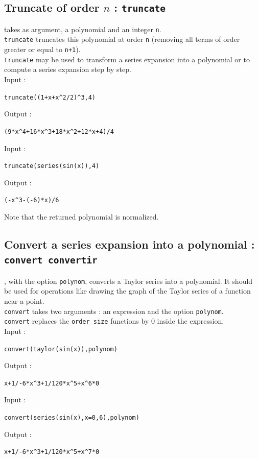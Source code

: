 \documentclass[a4paper,11pt]{book}
\begin{document}
\subsection{Truncate of order $n$ : {\tt truncate}}
 takes as argument, a polynomial and an integer 
{\tt n}.\\
{\tt truncate} truncates this polynomial at order {\tt n} (removing
all terms of order greater or equal to {\tt n+1}).\\
{\tt truncate} may be used to transform a series expansion into a 
polynomial or to compute a series expansion step by step.\\
Input :
\begin{center}{\tt truncate((1+x+x\verb|^|2/2)\verb|^|3,4)}\end{center}
Output :
\begin{center}{\tt (9*x\verb|^|4+16*x\verb|^|3+18*x\verb|^|2+12*x+4)/4}\end{center}
Input :
\begin{center}{\tt truncate(series(sin(x)),4)}\end{center}
Output :
\begin{center}{\tt (-x\verb|^|3-(-6)*x)/6}\end{center}
Note that the returned polynomial is normalized.

\subsection{Convert a series expansion into a polynomial : {\tt convert convertir}}\label{sec:convertpoly}
, with the option {\tt polynom}, converts a Taylor series
into a polynomial. It should be used for operations like drawing 
the graph of the Taylor series of a function near a point.\\
{\tt convert} takes two arguments : an expression
and the option {\tt polynom}.\\
{\tt convert} replaces the {\tt order\_size} functions by 0 inside the
expression.\\
Input :
\begin{center}{\tt convert(taylor(sin(x)),polynom)}\end{center}
Output :
\begin{center}{\tt x+1/-6*x\verb|^|3+1/120*\verb|x^|5+x\verb|^|6*0}\end{center}
Input :
\begin{center}{\tt convert(series(sin(x),x=0,6),polynom)}\end{center}
Output :
\begin{center}{\tt x+1/-6*x\verb|^|3+1/120*\verb|x^|5+x\verb|^|7*0}\end{center}
\end{document}
